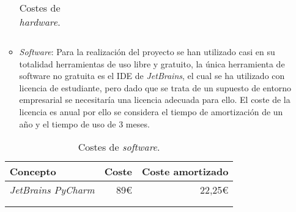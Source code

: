 \begin{itemize}
\begin{itemize}
\begin{longtable}[]{@{}lrr@{}}
\caption{Costes de \emph{hardware}.}
\end{longtable}
		\item \emph{Software}: Para la realización del proyecto se han utilizado casi en su totalidad herramientas de uso libre y gratuito, la única herramienta de software no gratuita es el IDE de \emph{JetBrains}, el cual se ha utilizado con licencia de estudiante, pero dado que se trata de un supuesto de entorno empresarial se necesitaría una licencia adecuada para ello. El coste de la licencia es anual por ello se considera el tiempo de amortización de un año y el tiempo de uso de 3 meses. 
	\end{itemize}
	\begin{longtable}[]{@{}lrr@{}}
\toprule
\begin{minipage}[b]{0.29\columnwidth}\raggedright\strut
\textbf{Concepto}\strut
\end{minipage} & \begin{minipage}[b]{0.18\columnwidth}\raggedright\strut
\textbf{Coste}\strut
\end{minipage} & \begin{minipage}[b]{0.32\columnwidth}\raggedright\strut
\textbf{Coste amortizado}\strut
\end{minipage}\tabularnewline
\midrule
\endhead
\begin{minipage}[t]{0.29\columnwidth}\raggedright\strut
\emph{JetBrains PyCharm}\strut
\end{minipage} & \begin{minipage}[t]{0.18\columnwidth}\raggedright\strut
89\euro{}\strut
\end{minipage} & \begin{minipage}[t]{0.32\columnwidth}\raggedright\strut
22,25\euro{}\strut
\end{minipage}\tabularnewline
\midrule
\begin{minipage}[t]{0.29\columnwidth}\raggedright\strut
\end{minipage}\tabularnewline

\caption{Costes de \emph{software}.}
\end{longtable}


\end{itemize}
